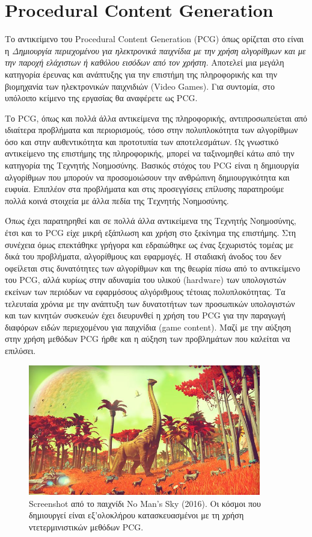 \thispagestyle{empty}

\chapter{Procedural Content Generation}

Το αντικείμενο του Procedural Content Generation (PCG) όπως ορίζεται στο 
\cite{pcgdef} είναι η \textit{Δημιουργία περιεχομένου για ηλεκτρονικά παιχνίδια με την χρήση αλγορίθμων και με την παροχή ελάχιστων ή καθόλου εισόδων από τον χρήστη}. Αποτελεί μια μεγάλη κατηγορία έρευνας και ανάπτυξης για την επιστήμη της πληροφορικής \cite{futureofcontent} και την βιομηχανία των ηλεκτρονικών παιχνιδιών (Video Games). Για συντομία, στο υπόλοιπο κείμενο της εργασίας θα αναφέρετε ως PCG.
\par
Το PCG, όπως και πολλά άλλα αντικείμενα της πληροφορικής, αντιπροσωπεύεται από ιδιαίτερα προβλήματα και περιορισμούς, τόσο στην πολυπλοκότητα των αλγορίθμων όσο και στην αυθεντικότητα και προτοτυπία των αποτελεσμάτων.  Ως γνωστικό αντικείμενο της επιστήμης της πληροφορικής, μπορεί να ταξινομηθεί κάτω από την κατηγορία της Τεχνητής Νοημοσύνης. Βασικός στόχος του PCG είναι η δημιουργία αλγορίθμων που μπορούν να προσομοιώσουν την ανθρώπινη δημιουργικότητα και ευφυία. Επιπλέον στα προβλήματα και στις προσεγγίσεις επίλυσης παρατηρούμε πολλά κοινά στοιχεία με άλλα πεδία της Τεχνητής Νοημοσύνης.
\par
Όπως έχει παρατηρηθεί και σε πολλά άλλα αντικείμενα της Τεχνητής Νοημοσύνης, έτσι και το PCG είχε μικρή εξάπλωση και χρήση στο ξεκίνημα της επιστήμης. Στη συνέχεια όμως επεκτάθηκε γρήγορα και εδραιώθηκε ως ένας ξεχωριστός τομέας με δικά του προβλήματα, αλγορίθμους και εφαρμογές. Η σταδιακή άνοδος του δεν οφείλεται στις δυνατότητες των αλγορίθμων και της θεωρία πίσω από το αντικείμενο του PCG, αλλά κυρίως στην αδυναμία του υλικού (hardware) των υπολογιστών εκείνων των περιόδων να εφαρμόσους αλγόριθμους τέτοιας πολυπλοκότητας. Τα τελευταία χρόνια με την ανάπτυξη των δυνατοτήτων των προσωπικών υπολογιστών και των κινητών συσκευών έχει διευρυνθεί η χρήση του PCG για την παραγωγή διαφόρων ειδών περιεχομένου για παιχνίδια (game content). Μαζί με την αύξηση στην χρήση μεθόδων PCG ήρθε και η αύξηση των προβλημάτων που καλείται να επιλύσει.

\begin{figure}[ht]
\centering
\includegraphics[width=4in]{../images/no-mans-sky.jpg}
\caption{Screenshot από το παιχνίδι No Man's Sky (2016). Οι κόσμοι που δημιουργεί είναι εξ'ολοκλήρου κατασκευασμένοι με τη χρήση ντετερμινιστικών μεθόδων PCG.}
\end{figure}

